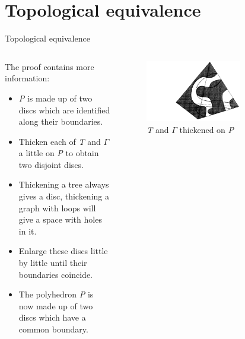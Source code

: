 \documentclass{beamer}
\begin{document}
\section{Topological equivalence}

\begin{frame}{Topological equivalence}
  \begin{columns}
    \begin{column}{0.6\textwidth}
      \begin{block}{}
        The proof contains more information:
        \begin{itemize}
        \item \textsl{P} is made up of two discs which are identified along their boundaries.
        \item Thicken each of \textsl{T} and $\Gamma$ a little on \textsl{P} to obtain two disjoint discs.
        \item Thickening a tree always gives a disc, thickening a graph with loops will give a space with holes in it.
        \item Enlarge these discs little by little until their boundaries coincide.
        \item The polyhedron \textsl{P} is now made up of two discs which have a common boundary.
        \end{itemize}
      \end{block}
    \end{column}
    \begin{column}{0.4\textwidth}
      \begin{figure}
        \centering
        \includegraphics[width=0.7\textwidth]{figure_1_6.png}
        \caption{\textsl{T} and $\Gamma$ thickened on \textsl{P}}
      \end{figure}
    \end{column}
  \end{columns}
\end{frame}
\end{document}
